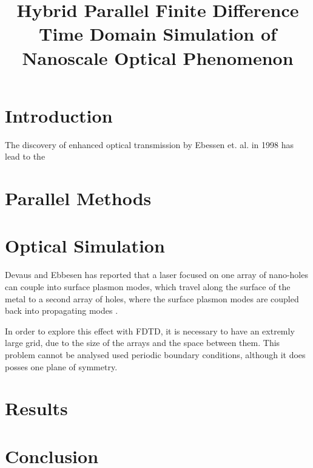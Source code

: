 \documentclass[11pt, conference, draftcls, letterpaper]{IEEEtran}
\begin{document}
\title{Hybrid Parallel Finite Difference Time Domain Simulation of
  Nanoscale Optical Phenomenon}
\author{ 
}

\maketitle

\begin{abstract}
  
\end{abstract}


\section{Introduction}
The discovery of enhanced optical transmission by Ebessen
et. al. \cite{ebessen1998} in 1998 has lead to the 

\section{Parallel Methods}


\section{Optical Simulation}
Devaus and Ebbesen has reported that a laser focused on one array of
nano-holes can couple into surface plasmon modes, which travel along
the surface of the metal to a second array of holes, where the surface
plasmon modes are coupled back into propagating modes \cite{devaux2003}.

In order to explore this effect with FDTD, it is necessary to have
an extremly large grid, due to the size of the arrays and the space
between them. This problem cannot be analysed used periodic boundary
conditions, although it does posses one plane of symmetry. 

\section{Results}

\section{Conclusion}




\end{document}
